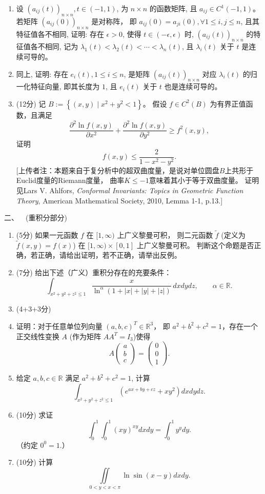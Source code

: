 \begin{enumerate}
$f(t, x)$ 有 $n$ 个实根 $\lambda_1(t)<\lambda_2(t)<\cdots<\lambda_n(t)$，
且它们关于 $t$ 是连续可导的。
\item[\bullet] 设 $(a_{i j}(t))_{n \times n}, t \in(-1,1)$, 
为 $n \times n$ 的函数矩阵, 且 $a_{i j} \in C^1(-1,1)$。
若矩阵 $(a_{i j}(0))_{n \times n}$ 是对称阵，
即 $a_{i j}(0)=a_{j i}(0), \forall 1 \leq i, j \leq n$, 且其特征值各不相同, 
证明: 存在 $\epsilon>0$, 使得 $t \in(-\epsilon, \epsilon)$ 时, 
$(a_{i j}(t))_{n \times n}$ 的特征值各不相同, 
记为 $\lambda_1(t)<\lambda_2(t)<\cdots<\lambda_n(t)$, 
且 $\lambda_i(t)$ 关于 $t$ 是连续可导的。
\item[\bullet] 同上, 证明: 存在 $e_i(t), 1 \leq i \leq n$, 
是矩阵 $(a_{i j}(t))_{n \times n}$ 对应 $\lambda_i(t)$ 的归一化特征向量, 
即其长度为 $1$, 且 $e_i(t)$ 关于 $t$ 也是连续可导的。
\item (12分) 记 $B:=\left\{(x, y) \mid x^2+y^2<1\right\}$。
假设 $f \in C^2(B)$ 为有界正值函数，且满足
$$\frac{\partial^2 \ln f(x, y)}{\partial x^2}
+\frac{\partial^2 \ln f(x, y)}{\partial y^2} \geq f^2(x, y),$$
证明
$$f(x, y) \leq \frac{2}{1-x^2-y^2}.$$
[上传者注：本题来自于复分析中的超双曲度量，是说对单位圆盘$B$上共形于Euclid度量的Riemann度量，
曲率$K\le-1$意味着其小于等于双曲度量。
证明见Lars V. Ahlfors, \textit{Conformal Invariants: Topics in Geometric Function Theory}, 
American Mathematical Society, 2010, Lemma 1-1, p.13.]
\end{enumerate}
二、\ \ (重积分部分) 
\begin{enumerate}
\item (5分) 如果一元函数 $f$ 在 $[1, \infty)$ 上广义黎曼可积，
则二元函数 $\tilde{f}$ (定义为 $\tilde{f}(x, y)=f(x)$) 在 $[1, \infty) \times[0,1]$ 上广义黎曼可积。
判断这个命题是否正确，若正确，请给出证明，若不正确，请举出反例。
\item (7分) 给出下述（广义）重积分存在的充要条件：
$$\int_{x^2+y^2+z^2 \leq 1} \frac{x}{\ln^\alpha(1+|x|+|y|+|z|)}\, dx dy dz, 
\qquad \alpha \in \mathbb{R}.$$
\item (4+3+3分)
\item[\bullet] 证明：对于任意单位列向量 $(a, b, c)^T \in \mathbb{R}^3$，
即 $a^2+b^2+c^2=1$，存在一个正交线性变换 $A$ (作为矩阵 $A A^T=I_3$)使得
$$A\begin{pmatrix}a \\b \\c\end{pmatrix}
=\begin{pmatrix}0 \\0 \\1\end{pmatrix}.$$
\item[\bullet] 给定 $a, b, c \in \mathbb{R}$ 满足 $a^2+b^2+c^2=1$, 计算
$$\int_{x^2+y^2+z^2 \leq 1}\left(e^{a x+b y+c z}+x y^2\right) dx dy dz.$$
\item (10分) 求证
$$\int_0^1 \int_0^1(xy)^{xy} dx dy=\int_0^1 y^y dy.$$
（约定 $0^0=1$.）
\item (10分) 计算
$$\iint\limits_{0<y<x<\pi} \ln \sin (x-y) dx dy.$$

\end{enumerate}
